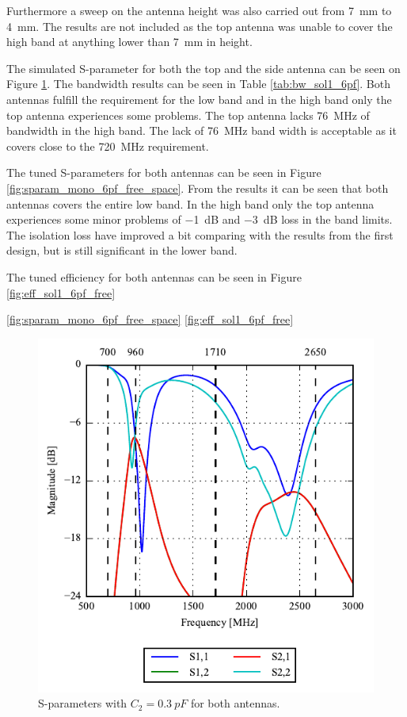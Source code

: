 Furthermore a sweep on the antenna height was also carried out from \SI{7}{mm} to \SI{4}{mm}. The results are not included as the top antenna was unable to cover the high band at anything lower than \SI{7}{mm} in height.


The simulated S-parameter for both the top and the side antenna can be seen on Figure \ref{fig:ant1_6pf_sparam}. The bandwidth results can be seen in Table \ref{tab:bw_sol1_6pf}. Both antennas fulfill the requirement for the low band and in the high band only the top antenna experiences some problems. The top antenna lacks \SI{76}{MHz} of bandwidth in the high band. The lack of \SI{76}{MHz} band width is acceptable as it covers close to the \SI{720}{MHz} requirement.

The tuned S-parameters for both antennas can be seen in Figure \ref{fig:sparam_mono_6pf_free_space}. From the results it can be seen that both antennas covers the entire low band. In the high band only the top antenna experiences some minor problems of \SI{-1}{dB} and \SI{-3}{dB} loss in the band limits. The isolation loss have improved a bit comparing with the results from the first design, but is still significant in the lower band.     

The tuned efficiency for both antennas can be seen in Figure \ref{fig:eff_sol1_6pf_free}



\ref{fig:sparam_mono_6pf_free_space}
\ref{fig:eff_sol1_6pf_free}

\begin{figure}[htbp]
    \centering
    \includegraphics{img/tech_sol/monopole/5mm/6pf_sparams}
    \caption{S-parameters with $C_2=\SI{0.3}{pF}$ for both antennas.}
    \label{fig:ant1_6pf_sparam}
\end{figure}

